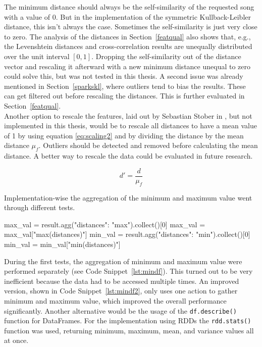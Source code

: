 \noindent The minimum distance should always be the self-similarity of the requested song with a value of 0. But in the implementation of the symmetric Kullback-Leibler distance, this isn't always the case. Sometimes the self-similarity is just very close to zero. The analysis of the distances in Section~\ref{featqual} also shows that, e.g., the Levenshtein distances and cross-correlation results are unequally distributed over the unit interval $[0,1]$. Dropping the self-similarity out of the distance vector and rescaling it afterward with a new minimum distance unequal to zero could solve this, but was not tested in this thesis. A second issue was already mentioned in Section~\ref{sparkskl}, where outliers tend to bias the results. These can get filtered out before rescaling the distances. This is further evaluated in Section~\ref{featqual}.\\
Another option to rescale the features, laid out by Sebastian Stober in \cite[pp. 543ff]{musicdata}, but not implemented in this thesis, would be to rescale all distances to have a mean value of 1 by using equation \eqref{eq:scaling2} and by dividing the distance by the mean distance $\mu_f$. Outliers should be detected and removed before calculating the mean distance. 
A better way to rescale the data could be evaluated in future research. 

\begin{equation} \label{eq:scaling2}
d' = \frac{d}{\mu_f}
\end{equation} 

\noindent Implementation-wise the aggregation of the minimum and maximum value went through different tests. 

\begin{pythonCode}[frame=single,label={lst:mindf},caption={Minimum and maximum aggregation separate},captionpos=b]
max_val = result.agg({"distances": "max"}).collect()[0]
max_val = max_val["max(distances)"]
min_val = result.agg({"distances": "min"}).collect()[0]
min_val = min_val["min(distances)"]
\end{pythonCode}

\noindent During the first tests, the aggregation of minimum and maximum value were performed separately (see Code Snippet~\ref{lst:mindf}). This turned out to be very inefficient because the data had to be accessed multiple times. 
\noindent An improved version, shown in Code Snippet~\ref{lst:mindf2}, only uses one action to gather minimum and maximum value, which improved the overall performance significantly. 
\noindent Another alternative would be the usage of the \lstinline{df.describe()} function for DataFrames. For the implementation using RDDs the \lstinline{rdd.stats()} function was used, returning minimum, maximum, mean, and variance values all at once. 

